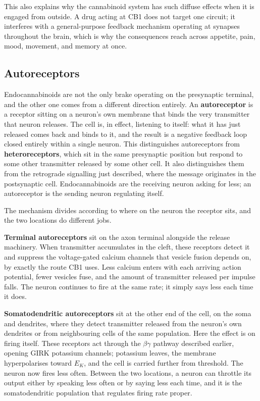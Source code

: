 \documentclass[11pt]{article}
\begin{document}
This also explains why the cannabinoid system has such diffuse effects when it is engaged from outside. A drug acting at CB1 does not target one circuit; it interferes with a general-purpose feedback mechanism operating at synapses throughout the brain, which is why the consequences reach across appetite, pain, mood, movement, and memory at once.

\subsection{Autoreceptors}

Endocannabinoids are not the only brake operating on the presynaptic terminal, and the other one comes from a different direction entirely. An \textbf{autoreceptor} is a receptor sitting on a neuron's own membrane that binds the very transmitter that neuron releases. The cell is, in effect, listening to itself: what it has just released comes back and binds to it, and the result is a negative feedback loop closed entirely within a single neuron. This distinguishes autoreceptors from \textbf{heteroreceptors}, which sit in the same presynaptic position but respond to some other transmitter released by some other cell. It also distinguishes them from the retrograde signalling just described, where the message originates in the postsynaptic cell. Endocannabinoids are the receiving neuron asking for less; an autoreceptor is the sending neuron regulating itself.

The mechanism divides according to where on the neuron the receptor sits, and the two locations do different jobs.

\textbf{Terminal autoreceptors} sit on the axon terminal alongside the release machinery. When transmitter accumulates in the cleft, these receptors detect it and suppress the voltage-gated calcium channels that vesicle fusion depends on, by exactly the route CB1 uses. Less calcium enters with each arriving action potential, fewer vesicles fuse, and the amount of transmitter released per impulse falls. The neuron continues to fire at the same rate; it simply says less each time it does.

\textbf{Somatodendritic autoreceptors} sit at the other end of the cell, on the soma and dendrites, where they detect transmitter released from the neuron's own dendrites or from neighbouring cells of the same population. Here the effect is on firing itself. These receptors act through the $\beta\gamma$ pathway described earlier, opening GIRK potassium channels; potassium leaves, the membrane hyperpolarises toward $E_K$, and the cell is carried further from threshold. The neuron now fires less often. Between the two locations, a neuron can throttle its output either by speaking less often or by saying less each time, and it is the somatodendritic population that regulates firing rate proper.
\end{document}
